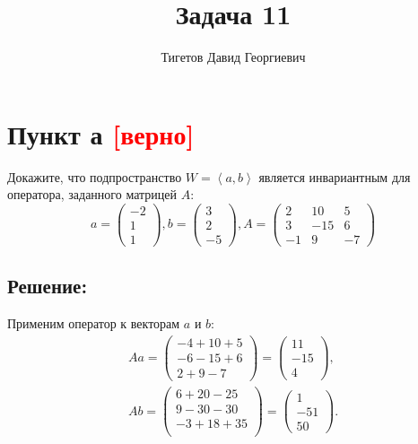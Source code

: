 \documentclass[12pt]{article}
\begin{document}
    \title{Задача 11}
    \author{Тигетов Давид Георгиевич}
    \date{}
    \maketitle

    \section*{Пункт а \textcolor{red}{[верно]}}
    Докажите, что подпространство $W = \left < a, b \right >$ является инвариантным для оператора, заданного матрицей $A$:
    \[
        a = \begin{pmatrix}
                -2 \\ 1 \\ 1
        \end{pmatrix},
        b = \begin{pmatrix}
                3 \\ 2 \\ -5
        \end{pmatrix},
        A = \begin{pmatrix}
                2  & 10  & 5  \\
                3  & -15 & 6  \\
                -1 & 9   & -7
        \end{pmatrix}
    \]

    \subsection*{Решение:}
    Применим оператор к векторам $a$ и $b$:
    \begin{gather*}
        A a
        =
        \begin{pmatrix}
            -4 + 10 + 5 \\
            -6 - 15 + 6 \\
            2 + 9 - 7
        \end{pmatrix}
        =
        \begin{pmatrix}
            11  \\
            -15 \\
            4
        \end{pmatrix} , \\
        A b
        =
        \begin{pmatrix}
            6 + 20 - 25   \\
            9 - 30 - 30   \\
            - 3 + 18 + 35 \\
        \end{pmatrix}
        =
        \begin{pmatrix}
            1    \\
            - 51 \\
            50
        \end{pmatrix}
        .
    \end{gather*}
\end{document}
